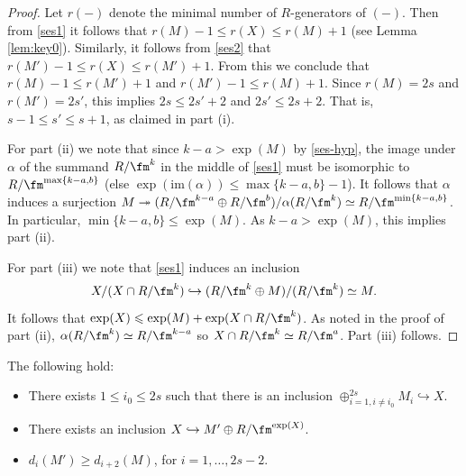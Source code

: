 \begin{proof} Let $r(-)$ denote the minimal number of $R$-generators of $(-)$. Then from \eqref{ses1} it follows
that $r(M) -1\leqslant r(X) \leqslant r(M)+1$ (see Lemma \ref{lem:key0}).
Similarly, it follows from \eqref{ses2} that
$r(M')-1\leqslant r(X) \leqslant r(M')+1$. From this we conclude that $r(M)-1\leqslant r(M')+1$ and $r(M')-1\leqslant r(M)+1$.
Since $r(M) = 2s$ and $r(M') = 2s'$, this implies $2s\leqslant 2s'+2$ and $2s'\leqslant 2s+2$. That is,
$s-1\leqslant s'\leqslant s+1$, as claimed in part (i).

For part (ii) we note that since $k-a>\exp(M)$ by \eqref{ses-hyp}, the image under $\alpha$ of the summand $R/\fm^k$ in the middle
of \eqref{ses1} must be isomorphic to $R/\fm^{\max\{k-a,b\}}$ (else $\exp(\mathrm{im}(\alpha))\leqslant \max\{k-a,b\}-1$).
It follows that $\alpha$ induces a surjection $M\twoheadrightarrow (R/\fm^ {k-a}\oplus R/\fm^b)/\alpha(R/\fm^k) \simeq R/\fm^{\min\{k-a,b\}}$.
In particular, $\min\{k-a,b\}\leq \exp(M)$. As $k-a>\exp(M)$, this implies part (ii).

For part (iii) we note that \eqref{ses1} induces an inclusion
$$
X/(X\cap R/\fm^k) \hookrightarrow (R/\fm^k\oplus M)/(R/\fm^k) \simeq M.
$$
It follows that $\exp(X)\leqslant \exp(M) + \exp(X\cap R/\fm^k)$.  As noted in the proof of part (ii), $\alpha(R/\fm^k) \simeq R/\fm^{k-a}$
so $X\cap R/\fm^k \simeq R/\fm^a$. Part (iii) follows.
\end{proof}




\begin{prop}
\notready\label{prop:key} The following hold:
\begin{itemize}
\item[(i)] There exists $1\leqslant i_0\leqslant 2s$ such that there is an inclusion
$\oplus_{i=1, i\neq i_0}^{2s} M_i \hookrightarrow X. $
\item[(ii)] There exists an inclusion $ X \hookrightarrow M'\oplus R/\fm^{\exp(X)}$.
\item[(iii)] $d_{i}(M') \geqslant  d_{i+2}(M)$, for $i=1,\dots,2s-2$.
\end{itemize}
\end{prop}

